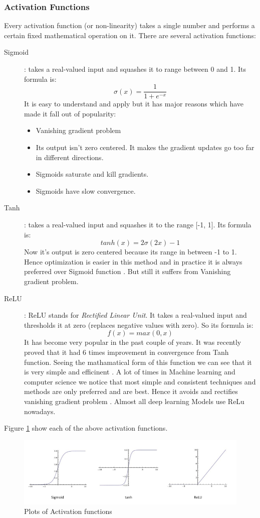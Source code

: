 \documentclass{report}
\begin{document}
\subsubsection{Activation Functions} 
Every activation function (or non-linearity) takes a single number and performs a certain fixed mathematical operation on it. There are
several activation functions:
\begin{description}
\item[ Sigmoid ] : takes a real-valued input and squashes it to range between 0 and 1. Its formula is:
  \[ \sigma(x) = \frac{1}{1 + e^{-x} } \]
  It is easy to understand and apply but it has major reasons which have made it fall out of popularity:
  \begin{itemize}
  \item Vanishing gradient problem
  \item Its output isn’t zero centered. It makes the gradient updates go too far in different directions.
  \item Sigmoids saturate and kill gradients.
  \item Sigmoids have slow convergence.
  \end{itemize}

\item [ Tanh ] : takes a real-valued input and squashes it to the range [-1, 1]. Its formula is:
  \[ tanh(x) = 2 \sigma(2x) -1 \]
  Now it’s output is zero centered because its range in between -1 to 1. Hence optimization is easier in this method and  in practice it is always preferred over Sigmoid function . But still it suffers from Vanishing gradient problem.

\item[ ReLU ]: ReLU stands for \textit{Rectified Linear Unit}. It takes a real-valued input and thresholds it at zero (replaces negative values with zero). So its formula is:
  \[ f(x) = max(0,x) \]
  It has become very popular in the past couple of years. It was recently proved that it had 6 times improvement in convergence from Tanh
  function. Seeing the mathamatical form of this function we can see that it is very simple and efficinent . A lot of times in Machine
  learning and computer science we notice that most simple and consistent techniques and methods are only preferred and are best.
  Hence it avoids and rectifies vanishing gradient problem . Almost all deep learning Models use ReLu nowadays.
\end{description}

Figure \ref{fig:Activation}  show each of the above activation functions.
\begin{figure}[h]
  \centering
  \includegraphics[scale=1.0]{activation_figures}
  \caption{Plots of Activation functions}
  \label{fig:Activation}
\end{figure}
\end{document}
